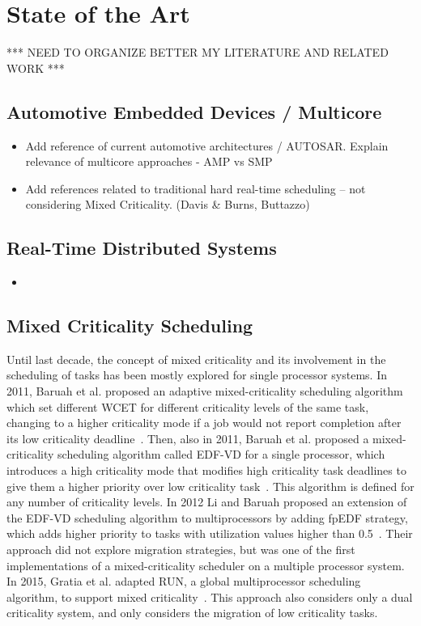 
\chapter{State of the Art}\label{chap:sota}
*** NEED TO ORGANIZE BETTER MY LITERATURE AND RELATED WORK ***

\section{Automotive Embedded Devices / Multicore}
\begin{itemize}
	\item Add reference of current automotive architectures / AUTOSAR. Explain relevance of multicore approaches - AMP vs SMP
	\item Add references related to traditional hard real-time scheduling -- not considering Mixed Criticality. (Davis \& Burns, Buttazzo)
\end{itemize}

\section{Real-Time Distributed Systems}
\begin{itemize}
	\item
\end{itemize}

\section{Mixed Criticality Scheduling}
Until last decade, the concept of mixed criticality and its involvement in the scheduling of tasks has been mostly explored for single processor systems. In 2011, Baruah et al. proposed an adaptive mixed-criticality scheduling algorithm which set different WCET for different criticality levels of the same task, changing to a higher criticality mode if a job would not report completion after its low criticality deadline~\parencite{baruah2}. Then, also in 2011, Baruah et al. proposed a mixed-criticality scheduling algorithm called EDF-VD for a single processor, which introduces a high criticality mode that modifies high criticality task deadlines to give them a higher priority over low criticality task~\parencite{baruah1}. This algorithm is defined for any number of criticality levels. In 2012 Li and Baruah proposed an extension of the EDF-VD scheduling algorithm to multiprocessors by adding fpEDF strategy, which adds higher priority to tasks with utilization values higher than 0.5~\parencite{libaruah1}. Their approach did not explore migration strategies, but was one of the first implementations of a mixed-criticality scheduler on a multiple processor system. In 2015, Gratia et al. adapted RUN, a global multiprocessor scheduling algorithm, to support mixed criticality~\parencite{gratia1}. This approach also considers only a dual criticality system, and only considers the migration of low criticality tasks.


